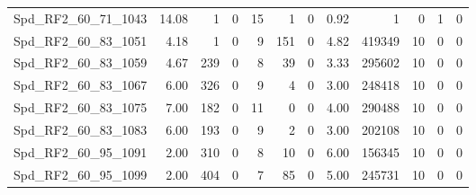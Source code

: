 \begin{longtable}[c]{@{}lrrrrrrrrrrr@{}}
Spd\_RF2\_60\_71\_1043       & 14.08                  & 1                       & 0                       & 15                     & 1                       & 0                       & 0.92                    & 1                        & 0                        & 1                        & 0                        \\
Spd\_RF2\_60\_83\_1051       & 4.18                   & 1                       & 0                       & 9                      & 151                     & 0                       & 4.82                    & 419349                   & 10                       & 0                        & 0                        \\
Spd\_RF2\_60\_83\_1059       & 4.67                   & 239                     & 0                       & 8                      & 39                      & 0                       & 3.33                    & 295602                   & 10                       & 0                        & 0                        \\
Spd\_RF2\_60\_83\_1067       & 6.00                   & 326                     & 0                       & 9                      & 4                       & 0                       & 3.00                    & 248418                   & 10                       & 0                        & 0                        \\
Spd\_RF2\_60\_83\_1075       & 7.00                   & 182                     & 0                       & 11                     & 0                       & 0                       & 4.00                    & 290488                   & 10                       & 0                        & 0                        \\
Spd\_RF2\_60\_83\_1083       & 6.00                   & 193                     & 0                       & 9                      & 2                       & 0                       & 3.00                    & 202108                   & 10                       & 0                        & 0                        \\
Spd\_RF2\_60\_95\_1091       & 2.00                   & 310                     & 0                       & 8                      & 10                      & 0                       & 6.00                    & 156345                   & 10                       & 0                        & 0                        \\
Spd\_RF2\_60\_95\_1099       & 2.00                   & 404                     & 0                       & 7                      & 85                      & 0                       & 5.00                    & 245731                   & 10                       & 0                        & 0                        \\

\end{longtable}
